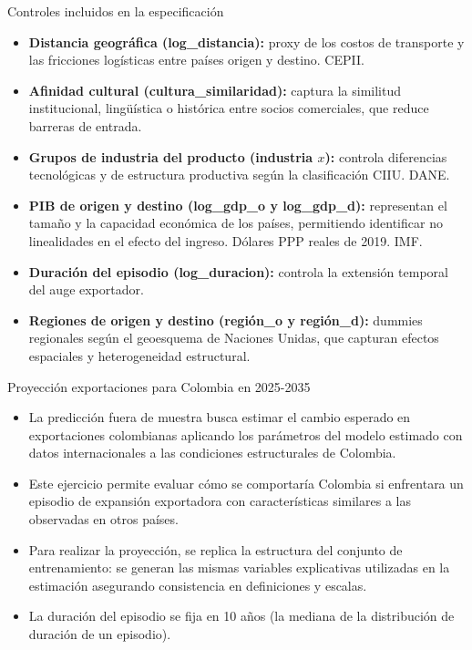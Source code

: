 \documentclass[aspectratio=169,xcolor=dvipsnames]{beamer}
\begin{document}
\begin{frame}{Controles incluidos en la especificación}
    \begin{itemize}
        \item \textbf{Distancia geográfica (log\_distancia):} proxy de los costos de transporte y las fricciones logísticas entre países origen y destino. CEPII.
        \item \textbf{Afinidad cultural (cultura\_similaridad):} captura la similitud institucional, lingüística o histórica entre socios comerciales, que reduce barreras de entrada.
        \item \textbf{Grupos de industria del producto (industria $x$):} controla diferencias tecnológicas y de estructura productiva según la clasificación CIIU. DANE.
        \item \textbf{PIB de origen y destino (log\_gdp\_o y log\_gdp\_d):} representan el tamaño y la capacidad económica de los países, permitiendo identificar no linealidades en el efecto del ingreso. Dólares PPP reales de 2019. IMF.
        \item \textbf{Duración del episodio (log\_duracion):} controla la extensión temporal del auge exportador.
        \item \textbf{Regiones de origen y destino (región\_o y región\_d):} dummies regionales según el geoesquema de Naciones Unidas, que capturan efectos espaciales y heterogeneidad estructural.
    \end{itemize}
\end{frame}

\begin{frame}{Proyección exportaciones para Colombia en 2025-2035}
    \begin{itemize}
        \item La predicción fuera de muestra busca estimar el cambio esperado en exportaciones colombianas aplicando los parámetros del modelo estimado con datos internacionales a las condiciones estructurales de Colombia.
        \item Este ejercicio permite evaluar cómo se comportaría Colombia si enfrentara un episodio de expansión exportadora con características similares a las observadas en otros países.
        \item Para realizar la proyección, se replica la estructura del conjunto de entrenamiento: se generan las mismas variables explicativas utilizadas en la estimación asegurando consistencia en definiciones y escalas.
        \item La duración del episodio se fija en 10 años (la mediana de la distribución de duración de un episodio).
    \end{itemize}
\end{frame}
\end{document}
